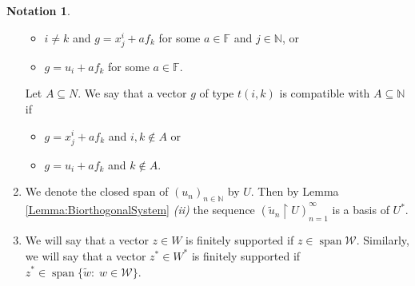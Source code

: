 \documentclass{amsart}
\theoremstyle{definition}
\newtheorem{notation}[theorem]{Notation}
\begin{document}
\begin{notation}
\begin{enumerate}[1.]
            \begin{itemize}
                \item $i \neq k$ and $g = x^i_j + a f_k$ for some $a \in \mathbb{F}$ and $j \in \mathbb{N}$, or
                \item $g = u_i + a f_k$ for some $a \in \mathbb{F}$.
            \end{itemize}
        Let $A \subseteq{N}$. We say that a vector $g$ of type $t(i,k)$ is compatible with $A \subseteq \mathbb{N}$ if
        \begin{itemize}
            \item $g = x^i_j + af_k$ and $i,k \notin A$ or
            \item $g = u_i + af_k$ and $k \notin A$.
        \end{itemize}
        \item We denote the closed span of $(u_n)_{n \in \mathbb{N}}$ by $U$. Then by Lemma \ref{Lemma:BiorthogonalSystem} \textit{(ii)} the sequence $(\widetilde{u}_n \restriction U)_{n=1}^\infty$ is a basis of $U^*$.
        \item We will say that a vector $z \in W$ is finitely supported if $z \in \operatorname{span} \mathcal{W}$. Similarly, we will say that a vector $z^* \in W^*$ is finitely supported if $z^* \in \operatorname{span} \{\widetilde{w}: \; w \in \mathcal{W}\}$.
    \end{enumerate}
\end{notation}
\end{document}
